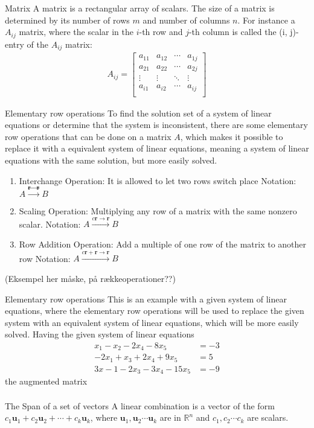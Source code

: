 \begin{definition}{Matrix}
A matrix is a rectangular array of scalars. The size of a matrix is determined by its number of rows $m$ and number of columns $n$. 
For instance a $A_{ij}$ matrix, where the scalar in the $i$-th row and $j$-th column is called the (i, j)-entry of the $A_{ij}$ matrix:
\begin{align*}
    A_{ij} = 
    \begin{bmatrix}
    a_{1 1} & a_{1 2} & \cdots & a_{1 j}\\
    a_{2 1} & a_{2 2} & \cdots & a_{2 j}\\
    \vdots  &   \vdots &  \ddots   & \vdots \\
    a_{i 1} & a_{i 2} & \cdots & a_{i j}\\
    \end{bmatrix}
\end{align*}

\end{definition}
\begin{definition}{Elementary row operations}
To find the solution set of a system of linear equations or determine that the system is inconsistent, there are some elementary row operations that can be done on a matrix $A$, which makes it possible to replace it with a equivalent system of linear equations, meaning a system of linear equations with the same solution, but more easily solved.

\begin{enumerate}
    \item Interchange Operation:
    It is allowed to let two rows switch place 
    Notation: $A\xrightarrow{\textbf{r}\leftrightarrow \textbf{r}} B$ 
    \item Scaling Operation:
    Multiplying any row of a matrix with the same nonzero scalar.
    Notation: $A\xrightarrow{c\textbf{r}\rightarrow \textbf{r}} B$
    \item Row Addition Operation:
    Add a multiple of one row of the matrix to another row
    Notation: $A\xrightarrow{c\textbf{r}+\textbf{r}\rightarrow \textbf{r}} B$
\end{enumerate}
\end {definition}
(Eksempel her måske, på rækkeoperationer??)

\begin{example}{Elementary row operations}
This is an example with a given system of linear equations, where the  elementary row operations will be used to replace the given system with an equivalent system of linear equations, which will be more easily solved. Having the given system of linear equations
\begin{align*}
    x_1-x_2-2x_4-8x_5&=-3\\
    -2x_1+x_3+2x_4+9x_5 &= 5\\
    3x-1-2x_3-3x_4-15x_5&=-9
\end{align*}
the augmented matrix
\begin{align*}

\end{align*}
\end{example}

\begin{definition} {The Span of a set of vectors}
A linear combination is a vector of the form $c_1 \textbf{u}_1 + c_2\textbf{u}_2+ \cdots+ c_k\textbf{u}_k$, where $\textbf{u}_1,\textbf{u}_2 \cdots \textbf{u}_k$ are in $\mathbb{R}^n$ and $c_1, c_2 \cdots c_k$ are scalars. 
\end{definition}

